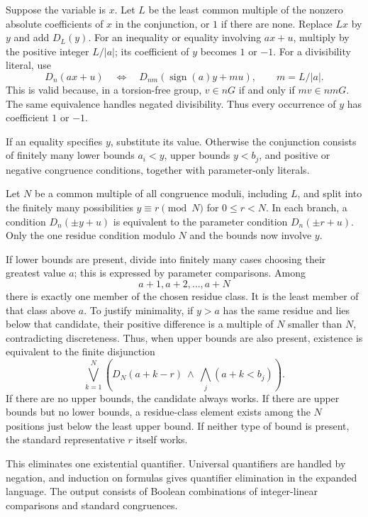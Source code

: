 \documentclass[11pt]{article}
\numberwithin{equation}{section}
\theoremstyle{definition}
\theoremstyle{remark}
\begin{document}
Suppose the variable is $x$. Let $L$ be the least common multiple
of the nonzero absolute coefficients of $x$ in the conjunction,
or $1$ if there are none. Replace $Lx$ by $y$ and add $D_L(y)$.
For an inequality or equality involving $a x+u$, multiply by the
positive integer $L/|a|$; its coefficient of $y$ becomes $1$ or
$-1$. For a divisibility literal, use
\begin{equation}
 D_n(a x+u)\quad\Longleftrightarrow\quad
 D_{nm}(\operatorname{sign}(a)y+mu),
 \qquad m=L/|a|.
 \label{pma:cp:eq:div-scale}
\end{equation}
This is valid because, in a torsion-free group,
$v\in nG$ if and only if $mv\in nmG$. The same equivalence handles
negated divisibility. Thus every occurrence of $y$ has coefficient
$1$ or $-1$.

If an equality specifies $y$, substitute its value. Otherwise the
conjunction consists of finitely many lower bounds $a_i<y$, upper
bounds $y<b_j$, and positive or negative congruence conditions,
together with parameter-only literals.

Let $N$ be a common multiple of all congruence moduli, including
$L$, and split into the finitely many possibilities
$y\equiv r\pmod N$ for $0\leq r<N$. In each branch, a condition
$D_n(\pm y+u)$ is equivalent to the parameter condition
$D_n(\pm r+u)$. Only the one residue condition modulo $N$ and the
bounds now involve $y$.

If lower bounds are present, divide into finitely many cases
choosing their greatest value $a$; this is expressed by
parameter comparisons. Among
\[
 a+1,a+2,\ldots,a+N
\]
there is exactly one member of the chosen residue class. It is
the least member of that class above $a$. To justify minimality,
if $y>a$ has the same residue and lies below that candidate,
their positive difference is a multiple of $N$ smaller than
$N$, contradicting discreteness. Thus, when upper bounds are
also present, existence is equivalent to the finite disjunction
\[
 \bigvee_{k=1}^N
 \left(D_N(a+k-r)\ \wedge\ \bigwedge_j(a+k<b_j)\right).
\]
If there are no upper bounds, the candidate always works.
If there are upper bounds but no lower bounds, a residue-class
element exists among the $N$ positions just below the least
upper bound. If neither type of bound is present, the standard
representative $r$ itself works.

This eliminates one existential quantifier. Universal quantifiers
are handled by negation, and induction on formulas gives quantifier
elimination in the expanded language. The output consists of
Boolean combinations of integer-linear comparisons and standard
congruences.
\end{document}
